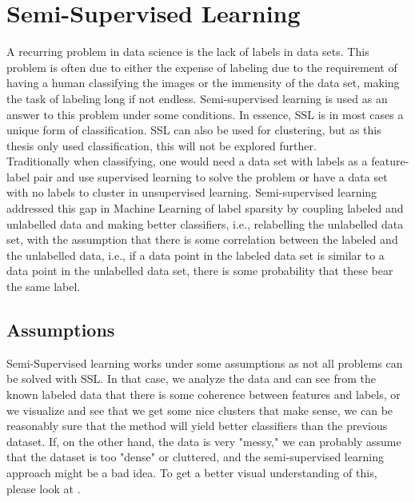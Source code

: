 \documentclass[10pt, letterpaper]{article}
\begin{document}
\section{Semi-Supervised Learning}
A recurring problem in data science is the lack of labels in data sets\cite{zhusurvey}. This problem is often due to either the expense of labeling due to the requirement of having a human classifying the images or the immensity of the data set, making the task of labeling long if not endless. Semi-supervised learning is used as an answer to this problem under some conditions. In essence, SSL is in most cases a unique form of classification. SSL can also be used for clustering, but as this thesis only used classification, this will not be explored further.\\ 
Traditionally when classifying, one would need a data set with labels as a feature-label pair and use supervised learning to solve the problem or have a data set with no labels to cluster in unsupervised learning. Semi-supervised learning addressed this gap in Machine Learning of label sparsity by coupling labeled and unlabelled data and making better classifiers, i.e., relabelling the unlabelled data set, with the assumption that there is some correlation between the labeled and the unlabelled data, i.e., if a data point in the labeled data set is similar to a data point in the unlabelled data set, there is some probability that these bear the same label. 



\subsection{Assumptions}
Semi-Supervised learning works under some assumptions as not all problems can be solved with SSL.  In that case, we analyze the data and can see from the known labeled data that there is some coherence between features and labels, or we visualize and see that we get some nice clusters that make sense, we can be reasonably sure that the method will yield better classifiers than the previous dataset. If, on the other hand, the data is very "messy," we can probably assume that the dataset is too "dense" or cluttered, and the semi-supervised learning approach might be a bad idea. To get a better visual understanding of this, please look at .
\end{document}
